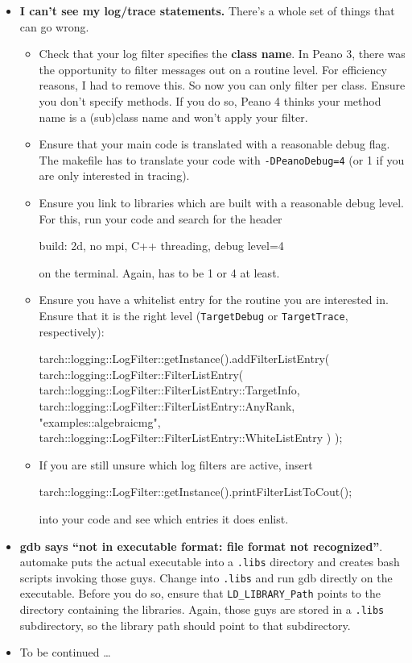 \begin{itemize}
  \item \textbf{I can't see my log/trace statements.} There's a whole set of
    things that can go wrong.
    \begin{itemize}
      \item Check that your log filter specifies the {\bf class name}. In Peano
      3, there was the opportunity to filter messages out on a routine level.
      For efficiency reasons, I had to remove this. So now you can only filter
      per class. Ensure you don't specify methods. If you do so, Peano 4 thinks
      your method name is a (sub)class name and won't apply your filter.
      \item Ensure that your main code is translated with
      a reasonable debug flag. The makefile has to translate your code with
      \texttt{-DPeanoDebug=4} (or 1 if you are only interested in tracing).
      \item     Ensure you link to libraries which are built with a reasonable debug level. 
    For this, run your code and search for the header
    \begin{code}
build: 2d, no mpi, C++ threading, debug level=4
    \end{code}
    on the terminal. Again, has to be 1 or 4 at least.
    \item Ensure you have a
    whitelist entry for the routine you are interested in. Ensure that it is the
    right level (\texttt{TargetDebug} or \texttt{TargetTrace}, respectively):
    \begin{code}
tarch::logging::LogFilter::getInstance().addFilterListEntry( 
  tarch::logging::LogFilter::FilterListEntry(
    tarch::logging::LogFilter::FilterListEntry::TargetInfo,
    tarch::logging::LogFilter::FilterListEntry::AnyRank,
    "examples::algebraicmg",
    tarch::logging::LogFilter::FilterListEntry::WhiteListEntry
  )
);
    \end{code}
    \item If you are still unsure which log filters are active, insert
    \begin{code}
tarch::logging::LogFilter::getInstance().printFilterListToCout();
    \end{code}
    into your code and see which entries it does enlist.
  \end{itemize}
  \item \textbf{gdb says ``not in executable format: file format not
    recognized''}. automake puts the actual executable into a \texttt{.libs}
    directory and creates bash scripts invoking those guys. Change into
    \texttt{.libs} and run gdb directly on the executable. Before you do so,
    ensure that \texttt{LD\_LIBRARY\_Path} points to the directory containing
    the libraries. Again, those guys are stored in a \texttt{.libs}
    subdirectory, so the library path should point to that subdirectory. 
  \item To be continued \dots
\end{itemize}
 
